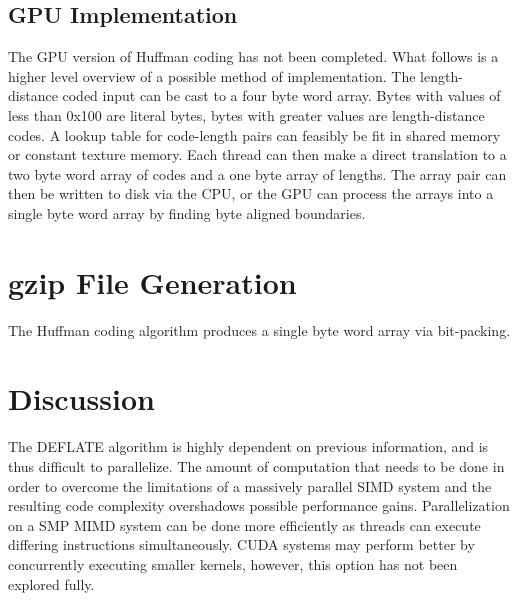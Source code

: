 \documentclass[twoside]{article}
\begin{document}
\begin{multicols}{2}
\subsection{GPU Implementation}

The GPU version of Huffman coding has not been completed. What follows is a higher level overview of a possible method of implementation. The length-distance coded input can be cast to a four byte word array. Bytes with values of less than 0x100 are literal bytes, bytes with greater values are length-distance codes. A lookup table for code-length pairs can feasibly be fit in shared memory or constant texture memory. Each thread can then make a direct translation to a two byte word array of codes and a one byte array of lengths. The array pair can then be written to disk via the CPU, or the GPU can process the arrays into a single byte word array by finding byte aligned boundaries.


\section{gzip File Generation}

The Huffman coding algorithm produces a single byte word array via bit-packing.



\section{Discussion}

The DEFLATE algorithm is highly dependent on previous information, and is thus difficult to parallelize. The amount of computation that needs to be done in order to overcome the limitations of a massively parallel SIMD system and the resulting code complexity overshadows possible performance gains. Parallelization on a SMP MIMD system can be done more efficiently as threads can execute differing instructions simultaneously. CUDA systems may perform better by concurrently executing smaller kernels, however, this option has not been explored fully.


\printbibliography


\end{multicols}
\end{document}
